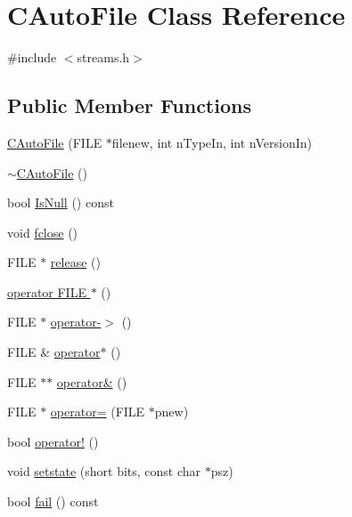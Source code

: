 \hypertarget{class_c_auto_file}{}\section{C\+Auto\+File Class Reference}
\label{class_c_auto_file}


{\ttfamily \#include $<$streams.\+h$>$}

\subsection*{Public Member Functions}
\begin{DoxyCompactItemize}
\item 
\hyperlink{class_c_auto_file_a52613083aaeab4c9238c649ae471783f}{C\+Auto\+File} (F\+I\+L\+E $\ast$filenew, int n\+Type\+In, int n\+Version\+In)
\item 
\hyperlink{class_c_auto_file_ab1362f4cb52c819c25cff4598e0f28da}{$\sim$\+C\+Auto\+File} ()
\item 
bool \hyperlink{class_c_auto_file_a78d666b1ef5dff5fd3f4ee33692b6d1d}{Is\+Null} () const 
\item 
void \hyperlink{class_c_auto_file_abcbafe943bfe392c09363078fa8a4e77}{fclose} ()
\item 
F\+I\+L\+E $\ast$ \hyperlink{class_c_auto_file_a25b51d94dc85c4140da0b15494ac9f8a}{release} ()
\item 
\hyperlink{class_c_auto_file_a903d7058c4cd92d3c13b0d62dfaee3f4}{operator F\+I\+L\+E $\ast$} ()
\item 
F\+I\+L\+E $\ast$ \hyperlink{class_c_auto_file_aef9213ad71294fc518e092771bf6ec46}{operator-\/$>$} ()
\item 
F\+I\+L\+E \& \hyperlink{class_c_auto_file_ad3baf76beb55cf98aa275bb9548840fc}{operator$\ast$} ()
\item 
F\+I\+L\+E $\ast$$\ast$ \hyperlink{class_c_auto_file_ac4d6f33720cc4755c9f9d98e4876cf03}{operator\&} ()
\item 
F\+I\+L\+E $\ast$ \hyperlink{class_c_auto_file_a1ceb9211a21bea5885204b8e05d2e422}{operator=} (F\+I\+L\+E $\ast$pnew)
\item 
bool \hyperlink{class_c_auto_file_a39e0a0cc31794200679b5db04c400ef9}{operator!} ()
\item 
void \hyperlink{class_c_auto_file_ad8f48031644ff88adb275e6dd146e9f5}{setstate} (short bits, const char $\ast$psz)
\item 
bool \hyperlink{class_c_auto_file_adfbf62852f7e892fe48c83f58d685c85}{fail} () const 
\item 
$$
\end{DoxyCompactItemize}
